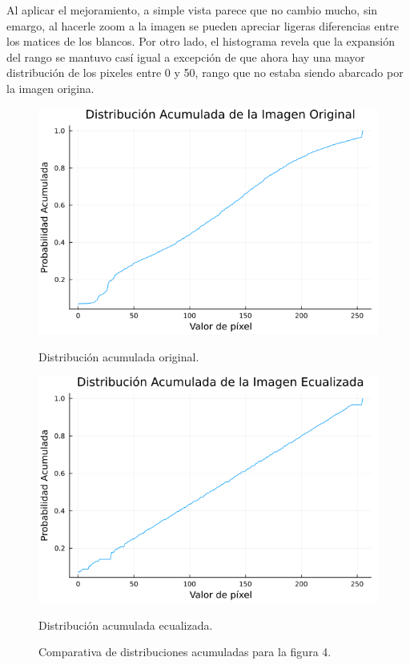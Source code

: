\documentclass[11pt, letterpaper]{article}
\begin{document}
Al aplicar el mejoramiento, a simple vista parece que no cambio mucho, sin emargo, al hacerle zoom a la imagen se pueden apreciar ligeras diferencias entre los matices de los blancos. Por otro lado, el histograma revela que la expansión del rango se mantuvo casí igual a excepción de que ahora hay una mayor distribución de los pixeles entre  0 y 50, rango que no estaba siendo abarcado por la imagen origina.


\begin{figure}[htbp]
	\centering
	\begin{minipage}{0.45\textwidth}
		\centering
		\includegraphics[width=\textwidth]{RESULTADOS/img42.png}
		\caption{Distribución acumulada original.}
		\label{fig:f27}
	\end{minipage}\hfill
	\begin{minipage}{0.45\textwidth}
		\centering
		\includegraphics[width=\textwidth]{RESULTADOS/img44.png}
		\caption{Distribución acumulada ecualizada.}
		\label{fig:f28}
	\end{minipage}
	\caption{Comparativa de distribuciones acumuladas para la figura 4.}
	\label{fig:R8}
\end{figure}
\end{document}
